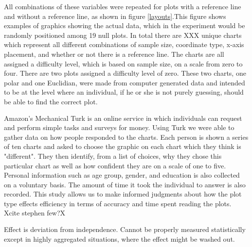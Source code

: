  All combinations of these variables were repeated for plots with a reference line and without a reference line, as shown in figure \ref{layouts}.This figure shows examples of graphics showing the actual data, which in the experiment would be randomly positioned among 19 null plots. In total there are XXX unique charts which represent all different combinations of sample size, coordinate type, x-axis placement, and whether or not there is a reference line. The charts are all assigned a difficulty level, which is based on sample size, on a scale from zero to four. There are two plots assigned a difficulty level of zero. These two charts, one polar and one Euclidian, were made from computer generated data and intended to be at the level where an individual, if he or she is not purely guessing, should be able to find the correct plot. 


Amazon's Mechanical Turk is an online service in which individuals can request and perform simple tasks and surveys for money. Using Turk we were able to gather data on how people responded to the charts. Each person is shown a series of ten charts and asked to choose the graphic on each chart which they think is "different". They then identify, from a list of choices, why they chose this particular chart as well as how confident they are on a scale of one to five. Personal information such as age group, gender, and education is also collected on a voluntary basis. The amount of time it took the individual to answer is also recorded. This study allows us to make informed judgments about how the plot type effects efficiency in terms of accuracy and time spent reading the plots. Xcite stephen few?X

Effect is deviation from independence. Cannot be properly measured statistically except in highly aggregated situations, where the effect might be washed out.



